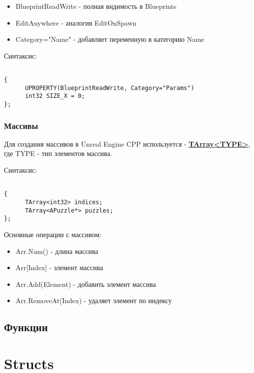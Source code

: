 \documentclass[a4paper,article,14pt]{extarticle}
\begin{document}
\begin{itemize}
\item{BlueprintReadWrite - полная видимость в Blueprints}
\item{EditAnywhere - аналогия EditOnSpawn}
\item{Category="Name" \- - добавляет переменную в категорию Name}
\end{itemize}

Синтаксис:

\begin{lstlisting}           

{
      UPROPERTY(BlueprintReadWrite, Category="Params")
      int32 SIZE_X = 0;
};

\end{lstlisting}          

\subsubsection{Массивы}

Для создания массивов в Unreal Engine CPP используется - \href{https://docs.unrealengine.com/4.26/en-US/ProgrammingAndScripting/ProgrammingWithCPP/UnrealArchitecture/TArrays/}{\textbf{TArray<TYPE>}}, где TYPE - тип элементов массива.

Синтаксис:

\begin{lstlisting}           

{
      TArray<int32> indices;
      TArray<APuzzle*> puzzles;
};

\end{lstlisting}          

Основные операции с массивом:

\begin{itemize}
\item{Arr.Num() - длина массива}
\item{Arr[Index] - элемент массива}
\item{Arr.Add(Element) - добавить элемент массива}
\item{Arr.RemoveAt(Index) - удаляет элемент по индексу}
\end{itemize}

\subsection{Функции}



\newpage
\section{Structs}
\end{document}
